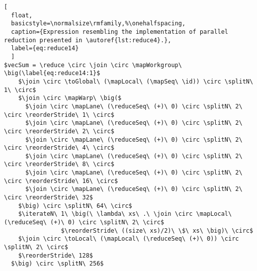 \begin{lstlisting}[
  float,
  basicstyle=\normalsize\rmfamily,%\onehalfspacing,
  caption={Expression resembling the implementation of parallel reduction presented in \autoref{lst:reduce4}.},
  label={eq:reduce14}
  ]
$vecSum = \reduce \circ \join \circ \mapWorkgroup\ \big(\label{eq:reduce14:1}$
    $\join \circ \toGlobal\ (\mapLocal\ (\mapSeq\ \id)) \circ \splitN\ 1\ \circ$
    $\join \circ \mapWarp\ \big($
      $\join \circ \mapLane\ (\reduceSeq\ (+)\ 0) \circ \splitN\ 2\ \circ \reorderStride\ 1\ \circ$
      $\join \circ \mapLane\ (\reduceSeq\ (+)\ 0) \circ \splitN\ 2\ \circ \reorderStride\ 2\ \circ$
      $\join \circ \mapLane\ (\reduceSeq\ (+)\ 0) \circ \splitN\ 2\ \circ \reorderStride\ 4\ \circ$
      $\join \circ \mapLane\ (\reduceSeq\ (+)\ 0) \circ \splitN\ 2\ \circ \reorderStride\ 8\ \circ$
      $\join \circ \mapLane\ (\reduceSeq\ (+)\ 0) \circ \splitN\ 2\ \circ \reorderStride\ 16\ \circ$
      $\join \circ \mapLane\ (\reduceSeq\ (+)\ 0) \circ \splitN\ 2\ \circ \reorderStride\ 32$
    $\big) \circ \splitN\ 64\ \circ$
    $\iterateN\ 1\ \big(\ \lambda\ xs\ .\ \join \circ \mapLocal\ (\reduceSeq\ (+)\ 0) \circ \splitN\ 2\ \circ$
                $\reorderStride\ ((size\ xs)/2)\ \$\ xs\ \big)\ \circ$
    $\join \circ \toLocal\ (\mapLocal\ (\reduceSeq\ (+)\ 0)) \circ \splitN\ 2\ \circ$
    $\reorderStride\ 128$
  $\big) \circ \splitN\ 256$
\end{lstlisting}
